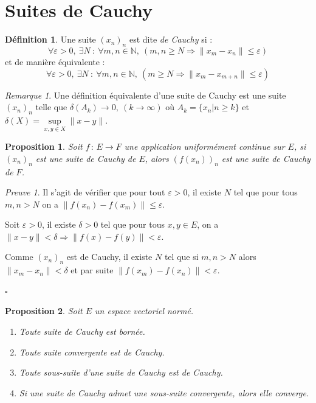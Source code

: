 \documentclass[]{article}
\newtheorem{myproposition}{Proposition}
\theoremstyle{remark}
\newtheorem{myrem}{Remarque}
\newtheorem{myproof}{Preuve}
\theoremstyle{definition}
\newtheorem{mydef}{Définition}
\newcommand{\cqfd}{
	\hfill$\square$
}
\newcommand{\funcshort}[3]{
#1 \, : \, #2 \longrightarrow #3
}
\begin{document}
\section{Suites de Cauchy}

\begin{mydef}
	Une suite $(x_n)_n$ est dite \textit{de Cauchy} si : $$\forall \varepsilon > 0, ~ \exists N ~ : ~ \forall m, n \in \mathbb{N}, ~(m, n \geqslant N \Longrightarrow \|x_m - x_n\| \leqslant \varepsilon)$$
	et de manière équivalente :
	$$\forall \varepsilon > 0, ~ \exists N ~ : ~ \forall m, n \in \mathbb{N}, ~(m \geqslant N \Longrightarrow \|x_m - x_{m+n}\| \leqslant \varepsilon)$$
\end{mydef}

\begin{myrem}
	Une définition équivalente d'une suite de Cauchy est une suite $(x_n)_n$ telle que $\delta(A_k) \longrightarrow 0, ~ (k \rightarrow \infty)$ où $A_k = \{x_n |n \geqslant k\}$ et $\delta (X) = \sup\limits_{x, y \in X} \|x - y\|$.
\end{myrem}

\begin{myproposition}
	Soit $\funcshort{f}{E}{F}$ une application uniformément continue sur $E$, si $(x_n)_n$ est une suite de Cauchy de $E$, alors $(f(x_n))_n$ est une suite de Cauchy de $F$.
\end{myproposition}

\begin{myproof}
	Il s'agit de vérifier que pour tout $\varepsilon > 0$, il existe $N$ tel que pour tous $m, n > N$ on a $\|f(x_n)-f(x_m)\| \leqslant \varepsilon$.
	
	Soit $\varepsilon > 0$, il existe $\delta > 0$ tel que pour tous $x, y \in E$, on a $\|x-y\| < \delta \Longrightarrow \|f(x)-f(y)\| < \varepsilon$.
	
	Comme $(x_n)_n$ est de Cauchy, il existe $N$ tel que si $m, n > N$ alors $\|x_m - x_n\| < \delta$ et par suite $\|f(x_m)-f(x_n)\| < \varepsilon$.
	
	\cqfd
\end{myproof}

\begin{myproposition}
	Soit $E$ un espace vectoriel normé.
	
	\begin{enumerate}
		\item Toute suite de Cauchy est bornée.
		\item Toute suite convergente est de Cauchy.
		\item Toute sous-suite d'une suite de Cauchy est de Cauchy.
		\item Si une suite de Cauchy admet une sous-suite convergente, alors elle converge.
	\end{enumerate}
\end{myproposition}
\end{document}

